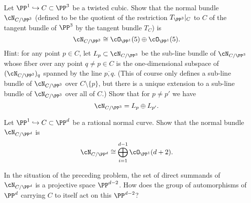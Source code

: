 \begin{exercise}
Let $\PP^1 \hookrightarrow C \subset \PP^3$ be a twisted cubic. Show that the normal bundle $\cN_{C/\PP^3}$ (defined to be the quotient of the restriction $T_{\PP^3}|_C$ to $C$ of the tangent bundle  of $\PP^3$  by the tangent bundle $T_C$) is 
$$
\cN_{C/\PP^3} \cong \cO_{\PP^1}(5) \oplus  \cO_{\PP^1}(5).
$$
Hint: for any point $p \in C$, let $L_p \subset \cN_{C/\PP^3}$ be the sub-line bundle of $\cN_{C/\PP^3}$ whose fiber over any point $q \neq p \in C$ is the one-dimensional subspace of $(\cN_{C/\PP^3})_q$ spanned by the line $\overline{p,q}$. (This of course only defines a sub-line bundle of $\cN_{C/\PP^3}$ over $C \setminus \{p\}$, but there is a unique extension to a sub-line bundle of $\cN_{C/\PP^3}$ over all of $C$.) Show that for $p \neq p'$ we have
$$
\cN_{C/\PP^3} = L_p \oplus L_{p'}.
$$
\end{exercise}

\begin{exercise}
Let $\PP^1 \hookrightarrow C \subset \PP^d$ be a rational normal curve. Show that the normal bundle $\cN_{C/\PP^d}$  is 
$$
\cN_{C/\PP^d} \cong \bigoplus_{i=1}^{d-1} \cO_{\PP^1}(d+2).
$$
\end{exercise}

\begin{exercise}
In the situation of the preceding problem, the set  of direct summands of $\cN_{C/\PP^d} $ is a projective space $\PP^{d-2}$. How does the  group of automorphisms of $\PP^d$ carrying $C$ to itself act on this $\PP^{d-2}$?

\end{exercise}




